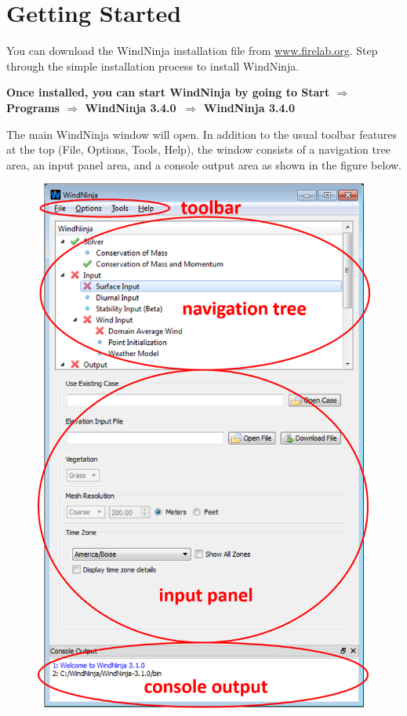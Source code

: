 \documentclass[12pt]{article}
\newcommand\vn{3.4.0}
\begin{document}
\section{Getting Started}

You can download the WindNinja installation file from \url{www.firelab.org}.  Step through the simple installation process to install WindNinja.

\textbf{\color{red}Once installed, you can start WindNinja by going to Start $\Rightarrow$ Programs $\Rightarrow$ WindNinja \vn\ $\Rightarrow$ WindNinja \vn\ }

The main WindNinja window will open.  In addition to the usual toolbar features at the top (File, Options, Tools, Help), the window consists of a navigation tree area, an input panel area, and a console output area as shown in the figure below.

\begin{figure}[H]
	\centering
	\label{}
	\includegraphics[scale=0.75]{layout_1.png}
\end{figure}
\end{document}
